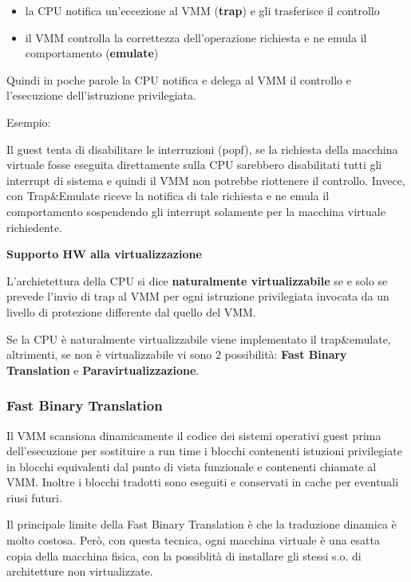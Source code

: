 \documentclass{article}
\begin{document}
\begin{itemize}
    \item la CPU notifica un'eccezione al VMM (\textbf{trap}) e gli trasferisce il controllo
    \item il VMM controlla la correttezza dell'operazione richiesta e ne emula il comportamento (\textbf{emulate})
\end{itemize}

Quindi in poche parole la CPU notifica e delega al VMM il controllo e l'esecuzione dell'istruzione privilegiata.

Esempio:

Il guest tenta di disabilitare le interruzioni (popf), se la richiesta della macchina virtuale fosse eseguita direttamente sulla CPU sarebbero disabilitati
tutti gli interrupt di sistema e quindi il VMM non potrebbe riottenere il controllo. Invece, con Trap\&Emulate riceve la notifica di tale richiesta e ne emula
il comportamento sospendendo gli interrupt solamente per la macchina virtuale richiedente.

\vspace{3mm}
\textbf{Supporto HW alla virtualizzazione}

L'archietettura della CPU si dice \textbf{naturalmente virtualizzabile} se e solo se prevede l'invio di trap al VMM per ogni istruzione privilegiata invocata da un
livello di protezione differente dal quello del VMM.

Se la CPU è naturalmente virtualizzabile viene implementato il trap\&emulate, altrimenti, se non è virtualizzabile vi sono 2 possibilità: \textbf{Fast Binary Translation} e 
\textbf{Paravirtualizzazione}.

\subsubsection{Fast Binary Translation}
Il VMM scansiona dinamicamente il codice dei sistemi operativi guest prima dell'esecuzione per sostituire a run time i blocchi contenenti istuzioni privilegiate
in blocchi equivalenti dal punto di vista funzionale e contenenti chiamate al VMM. Inoltre i blocchi tradotti sono eseguiti e conservati in cache per eventuali
riusi futuri.

Il principale limite della Fast Binary Translation è che la traduzione dinamica è molto costosa. Però, con questa tecnica, ogni macchina virtuale è una esatta
copia della macchina fisica, con la possiblità di installare gli stessi s.o. di architetture non virtualizzate.
\end{document}
